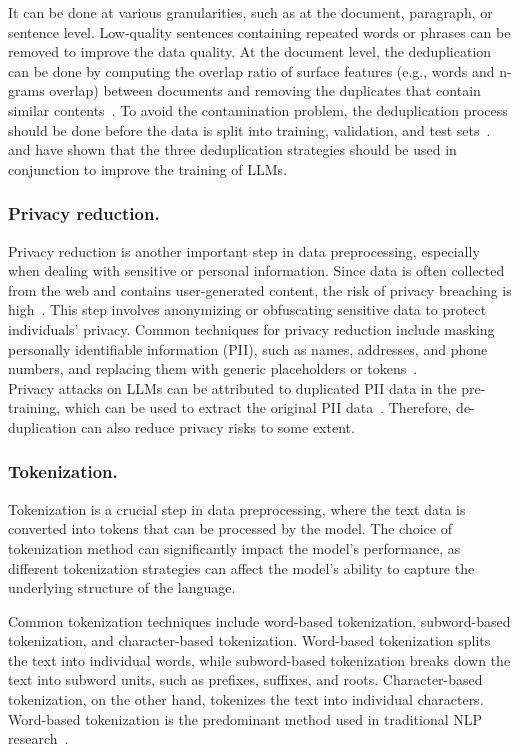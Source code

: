 It can be done at various granularities, such as at the document, paragraph, or sentence level.
Low-quality sentences containing repeated words or phrases can be removed to improve the data quality.
At the document level, the deduplication can be done by computing the overlap ratio of surface features (e.g., words and n-grams overlap) between documents and removing the duplicates that contain similar contents~\cite{touvron2023llama,rae2021scaling,workshop2023bloom,lee2022deduplicating}.
To avoid the contamination problem, the deduplication process should be done before the data is split into training, validation, and test sets~\cite{chowdhery2022palm}.
\textcite{chowdhery2022palm} and \textcite{carlini2022quantifying} have shown that the three deduplication strategies should be used in conjunction to improve the training of LLMs.

\subsubsection{Privacy reduction.}
Privacy reduction is another important step in data preprocessing, especially when dealing with sensitive or personal information.
Since data is often collected from the web and contains user-generated content, the risk of privacy breaching is high~\cite{carlini2021extracting}.
This step involves anonymizing or obfuscating sensitive data to protect individuals' privacy.
Common techniques for privacy reduction include masking personally identifiable information (PII), such as names, addresses, and phone numbers, and replacing them with generic placeholders or tokens~\cite{laurencon2022bigscience}.\\
Privacy attacks on LLMs can be attributed to duplicated PII data in the pre-training, which can be used to extract the original PII data~\cite{lee2022deduplicating}.
Therefore, de-duplication can also reduce privacy risks to some extent.

\subsubsection{Tokenization.}
Tokenization is a crucial step in data preprocessing, where the text data is converted into tokens that can be processed by the model.
The choice of tokenization method can significantly impact the model's performance, as different tokenization strategies can affect the model's ability to capture the underlying structure of the language.

Common tokenization techniques include word-based tokenization, subword-based tokenization, and character-based tokenization.
Word-based tokenization splits the text into individual words, while subword-based tokenization breaks down the text into subword units, such as prefixes, suffixes, and roots.
Character-based tokenization, on the other hand, tokenizes the text into individual characters.
Word-based tokenization is the predominant method used in traditional NLP research~\cite{lafferty2001conditional}.

